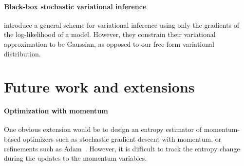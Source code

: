 \documentclass[]{article}
\begin{document}
\paragraph{Black-box stochastic variational inference}
\citet{alp2014blackbox} introduce a general scheme for variational inference using only the gradients of the log-likelihood of a model.
However, they constrain their variational approximation to be Gaussian, as opposed to our free-form variational distribution.






\section{Future work and extensions}

\paragraph{Optimization with momentum}
One obvious extension would be to design an entropy estimator of 
momentum-based optimizers such as stochastic gradient descent with momentum, or
refinements such as Adam~\citep{Adam14}.
However, it is difficult to track the entropy change during the updates to the momentum variables.
\end{document}
